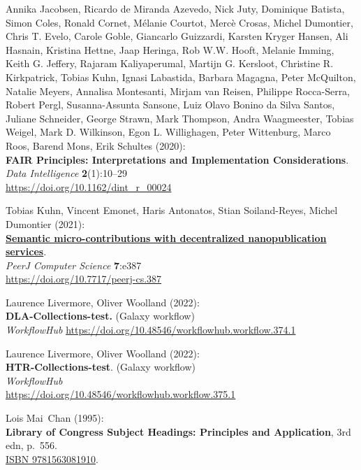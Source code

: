 \begin{thebibliography}{9}
 Annika Jacobsen, Ricardo de Miranda Azevedo, Nick
Juty, Dominique Batista, Simon Coles, Ronald Cornet, Mélanie Courtot,
Mercè Crosas, Michel Dumontier, Chris T. Evelo, Carole Goble, Giancarlo
Guizzardi, Karsten Kryger Hansen, Ali Hasnain, Kristina Hettne, Jaap
Heringa, Rob W.W. Hooft, Melanie Imming, Keith G. Jeffery, Rajaram
Kaliyaperumal, Martijn G. Kersloot, Christine R. Kirkpatrick, Tobias
Kuhn, Ignasi Labastida, Barbara Magagna, Peter McQuilton, Natalie
Meyers, Annalisa Montesanti, Mirjam van Reisen, Philippe Rocca-Serra,
Robert Pergl, Susanna-Assunta Sansone, Luiz Olavo Bonino da Silva
Santos, Juliane Schneider, George Strawn, Mark Thompson, Andra
Waagmeester, Tobias Weigel, Mark D. Wilkinson, Egon L. Willighagen,
Peter Wittenburg, Marco Roos, Barend Mons, Erik Schultes (2020):\\
\textbf{FAIR Principles: Interpretations and Implementation
Considerations}.\\
\emph{Data Intelligence} \textbf{2}(1):10--29\\
\url{https://doi.org/10.1162/dint_r_00024}

 Tobias Kuhn, Vincent Emonet, Haris Antonatos, Stian
Soiland-Reyes, Michel Dumontier (2021):\\
\href{../../../2021/phd/nanopub/}{\textbf{Semantic micro-contributions
with decentralized nanopublication services}}.\\
\emph{PeerJ Computer Science} \textbf{7}:e387\\
\url{https://doi.org/10.7717/peerj-cs.387}

 Laurence Livermore, Oliver Woolland (2022):\\
\textbf{DLA-Collections-test.} (Galaxy workflow)\\
\emph{WorkflowHub}
\url{https://doi.org/10.48546/workflowhub.workflow.374.1}

 Laurence Livermore, Oliver Woolland (2022):\\
\textbf{HTR-Collections-test}. (Galaxy workflow)\\
\emph{WorkflowHub}\\
\url{https://doi.org/10.48546/workflowhub.workflow.375.1}

 Lois Mai~Chan (1995):\\
\textbf{Library of Congress Subject Headings: Principles and
Application}, 3rd edn, p.~556.\\
\href{https://identifiers.org/isbn/9781563081910}{ISBN 9781563081910}.


\end{thebibliography}
